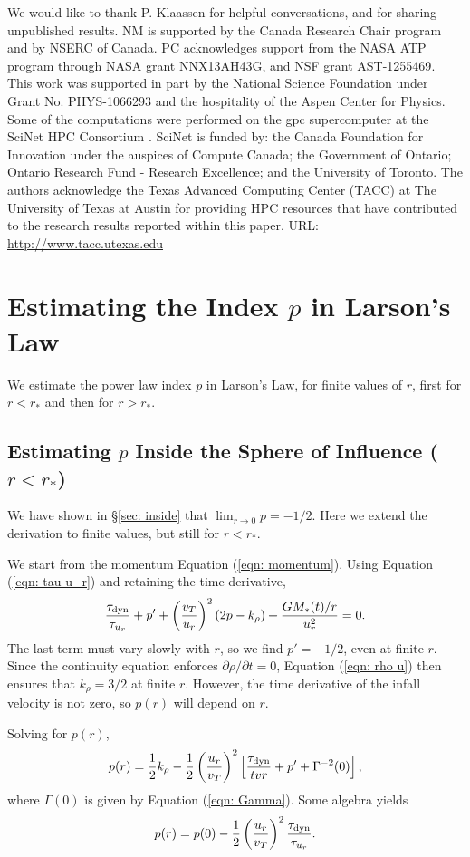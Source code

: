 \documentclass[iop,apj,numberedappendix]{emulateapj}
\newcommand       \phil[1]      {{\color{blue} #1}}
\newcommand       \be		{\begin{equation}}
\newcommand       \ee		{\end{equation}}
\newcommand       \tdyn         {\tau_{\rm dyn}}
\newcommand       \tvr  	{{\tau_{u_r}}}
\begin{document}
We would like to thank P. Klaassen for helpful conversations, and for
sharing unpublished results. NM is supported by the Canada Research
Chair program and by NSERC of Canada. \phil{PC acknowledges support from the NASA ATP
program through NASA grant NNX13AH43G, and NSF grant AST-1255469}.  This work was supported in part
by the National Science Foundation under Grant No. PHYS-1066293 and
the hospitality of the Aspen Center for Physics. Some of the
computations were performed on the gpc supercomputer at the SciNet HPC
Consortium \citep{2010JPhCS.256a2026L}. SciNet is funded by: the
Canada Foundation for Innovation under the auspices of Compute Canada;
the Government of Ontario; Ontario Research Fund - Research
Excellence; and the University of Toronto. The authors acknowledge the
Texas Advanced Computing Center (TACC) at The University of Texas at
Austin for providing HPC resources that have contributed to the
research results reported within this paper. URL:
\url{http://www.tacc.utexas.edu}

\appendix
\label{sec: appendix}
\section{Estimating the Index $p$ in Larson's Law}
We estimate the power law index $p$ in Larson's Law, for finite
values of $r$, first for $r<r_*$ and then for $r>r_*$. 

\subsection{Estimating $p$ Inside the Sphere of Influence ($r<r_*$)}
We have shown in \S \ref{sec: inside} that $\lim_{r\to0}p=-1/2$. Here
we extend the derivation to finite values, but still for $r<r_*$. 

We start from the momentum Equation (\ref{eqn: momentum}). Using
Equation (\ref{eqn: tau u_r}) and retaining the time derivative,
%
\be  %
{\tdyn\over \tvr}+p'+\left({v_T\over
  u_r}\right)^2(2p-k_\rho)+{GM_*(t)/r\over u_r^2}=0.
\ee  %
%
The last term must vary slowly with $r$, so we find $p'=-1/2$, even at
finite $r$. Since the continuity equation enforces $\partial
\rho/\partial t=0$, Equation (\ref{eqn: rho u}) then ensures that
$k_\rho=3/2$ at finite $r$. However, the time derivative of the infall
velocity is not zero, so $p(r)$ will depend on $r$.

Solving for $p(r)$,
%
\be  %
p(r) = {1\over2}k_\rho -{1\over2}\left({u_r\over  v_T}\right)^2
\left[{\tdyn\over tvr}+p'+\Gamma^{-2}(0)\right],
\ee  %
%
where $\Gamma(0)$ is given by Equation (\ref{eqn: Gamma}). Some algebra
yields
%
\be \label{eqn: p small r almost} %
p(r)=p(0)-{1\over 2}\left({u_r\over v_T}\right)^2{\tdyn\over \tvr}.
\ee  %
%
\end{document}
